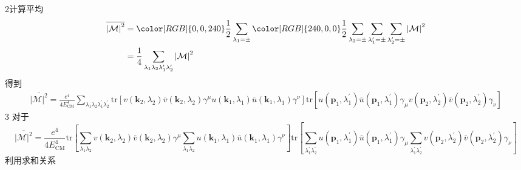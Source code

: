 2计算平均
\begin{equation}
    \begin{aligned}
        \overline{\left| \mathcal{M} \right|^2} &= {\color[RGB]{0, 0, 240} \frac{1}{2}\sum_{\lambda _1 =\pm}{{\color[RGB]{240, 0, 0} \frac{1}{2}\sum_{\lambda _2=\pm}{\sum_{\lambda _{1}^{\prime}=\pm}{\sum_{\lambda _{2}^{\prime}=\pm}{\left| \mathcal{M} \right|^2}}}}}}
\\
&=\frac{1}{4}\sum_{\lambda _1\lambda _2\lambda _{1}^{\prime}\lambda _{2}^{\prime}}{\left| \mathcal{M} \right|^2}
    \end{aligned}
\end{equation}
得到
\begin{equation}
    \begin{aligned}
        \overline{\left| \mathcal{M} \right|^2}=\frac{e^4}{4E_{\mathrm{CM}}^{4}}\sum_{\lambda _1\lambda _2\lambda _{1}^{\prime}\lambda _{2}^{\prime}}{\mathrm{tr}\left[ v(\mathbf{k}_2,\lambda _2)\bar{v}(\mathbf{k}_2,\lambda _2)\gamma ^{\mu}u(\mathbf{k}_1,\lambda _1)\bar{u}(\mathbf{k}_1,\lambda _1)\gamma ^{\nu} \right] \mathrm{tr}\left[ u(\mathbf{p}_1,\lambda _{1}^{\prime})\bar{u}(\mathbf{p}_1,\lambda _{1}^{\prime})\gamma _{\mu}v(\mathbf{p}_2,\lambda _{2}^{\prime})\bar{v}(\mathbf{p}_2,\lambda _{2}^{\prime})\gamma _{\nu} \right]}
    \end{aligned}
\end{equation}
3
对于
\begin{equation}
    \overline{\left| \mathcal{M} \right|^2}=\frac{e^4}{4E_{\mathrm{CM}}^{4}}\mathrm{tr}\left[ \sum_{\lambda _1\lambda _2}{v(\mathbf{k}_2,\lambda _2)\bar{v}(\mathbf{k}_2,\lambda _2)}\gamma ^{\mu}\sum_{\lambda _1\lambda _2}{u(\mathbf{k}_1,\lambda _1)\bar{u}(\mathbf{k}_1,\lambda _1)}\gamma ^{\nu} \right] \mathrm{tr}\left[ \sum_{\lambda _{1}^{\prime}\lambda _{2}^{\prime}}{u(\mathbf{p}_1,\lambda _{1}^{\prime})\bar{u}(\mathbf{p}_1,\lambda _{1}^{\prime})}\gamma _{\mu}\sum_{\lambda _{1}^{\prime}\lambda _{2}^{\prime}}{v(\mathbf{p}_2,\lambda _{2}^{\prime})\bar{v}(\mathbf{p}_2,\lambda _{2}^{\prime})}\gamma _{\nu} \right] 
\end{equation}
利用求和关系

